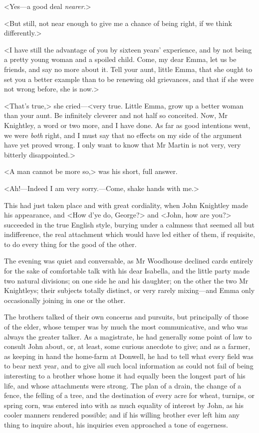 <Yes—a good deal \textit{nearer}.>

<But still, not near enough to give me a chance of being right, if we think differently.>

<I have still the advantage of you by sixteen years' experience, and by not being a pretty young woman and a spoiled child. Come, my dear Emma, let us be friends, and say no more about it. Tell your aunt, little Emma, that she ought to set you a better example than to be renewing old grievances, and that if she were not wrong before, she is now.>

<That's true,> she cried—<very true. Little Emma, grow up a better woman than your aunt. Be infinitely cleverer and not half so conceited. Now, Mr Knightley, a word or two more, and I have done. As far as good intentions went, we were \textit{both} right, and I must say that no effects on my side of the argument have yet proved wrong. I only want to know that Mr Martin is not very, very bitterly disappointed.>

<A man cannot be more so,> was his short, full answer.

<Ah!—Indeed I am very sorry.—Come, shake hands with me.>

This had just taken place and with great cordiality, when John Knightley made his appearance, and <How d'ye do, George?> and <John, how are you?> succeeded in the true English style, burying under a calmness that seemed all but indifference, the real attachment which would have led either of them, if requisite, to do every thing for the good of the other.

The evening was quiet and conversable, as Mr Woodhouse declined cards entirely for the sake of comfortable talk with his dear Isabella, and the little party made two natural divisions; on one side he and his daughter; on the other the two Mr Knightleys; their subjects totally distinct, or very rarely mixing—and Emma only occasionally joining in one or the other.

The brothers talked of their own concerns and pursuits, but principally of those of the elder, whose temper was by much the most communicative, and who was always the greater talker. As a magistrate, he had generally some point of law to consult John about, or, at least, some curious anecdote to give; and as a farmer, as keeping in hand the home-farm at Donwell, he had to tell what every field was to bear next year, and to give all such local information as could not fail of being interesting to a brother whose home it had equally been the longest part of his life, and whose attachments were strong. The plan of a drain, the change of a fence, the felling of a tree, and the destination of every acre for wheat, turnips, or spring corn, was entered into with as much equality of interest by John, as his cooler manners rendered possible; and if his willing brother ever left him any thing to inquire about, his inquiries even approached a tone of eagerness.

